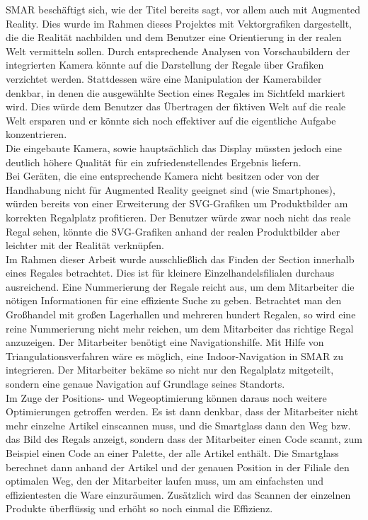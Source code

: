 \ac{SMAR} beschäftigt sich, wie der Titel bereits sagt, vor allem auch mit Augmented Reality. Dies wurde im Rahmen dieses Projektes mit Vektorgrafiken dargestellt, die die Realität nachbilden und dem Benutzer eine Orientierung in der realen Welt vermitteln sollen. Durch entsprechende Analysen von Vorschaubildern der integrierten Kamera könnte auf die Darstellung der Regale über Grafiken verzichtet werden. Stattdessen wäre eine Manipulation der Kamerabilder denkbar, in denen die ausgewählte Section eines Regales im Sichtfeld markiert wird. Dies würde dem Benutzer das Übertragen der fiktiven Welt auf die reale Welt ersparen und er könnte sich noch effektiver auf die eigentliche Aufgabe konzentrieren.\\
Die eingebaute Kamera, sowie hauptsächlich das Display müssten jedoch eine deutlich höhere Qualität für ein zufriedenstellendes Ergebnis liefern.\\
Bei Geräten, die eine entsprechende Kamera nicht besitzen oder von der Handhabung nicht für Augmented Reality geeignet sind (wie \zB Smartphones), würden bereits von einer Erweiterung der SVG-Grafiken um Produktbilder am korrekten Regalplatz profitieren. Der Benutzer würde zwar noch nicht das reale Regal sehen, könnte die SVG-Grafiken anhand der realen Produktbilder aber leichter mit der Realität verknüpfen.\\

Im Rahmen dieser Arbeit wurde ausschließlich das Finden der Section innerhalb eines Regales betrachtet. Dies ist für kleinere Einzelhandelsfilialen durchaus ausreichend. Eine Nummerierung der Regale reicht aus, um dem Mitarbeiter die nötigen Informationen für eine effiziente Suche zu geben. Betrachtet man den Großhandel mit großen Lagerhallen und mehreren hundert Regalen, so wird eine reine Nummerierung nicht mehr reichen, um dem Mitarbeiter das richtige Regal anzuzeigen. Der Mitarbeiter benötigt eine Navigationshilfe. Mit Hilfe von Triangulationsverfahren wäre es möglich, eine Indoor-Navigation in \ac{SMAR} zu integrieren. Der Mitarbeiter bekäme so nicht nur den Regalplatz mitgeteilt, sondern eine genaue Navigation auf Grundlage seines Standorts.\\
Im Zuge der Positions- und Wegeoptimierung können daraus noch weitere Optimierungen getroffen werden. Es ist dann denkbar, dass der Mitarbeiter nicht mehr einzelne Artikel einscannen muss, und die Smartglass dann den Weg bzw. das Bild des Regals anzeigt, sondern dass der Mitarbeiter einen Code scannt, zum Beispiel einen Code an einer Palette, der alle Artikel enthält. Die Smartglass berechnet dann anhand der Artikel und der genauen Position in der Filiale den optimalen Weg, den der Mitarbeiter laufen muss, um am einfachsten und effizientesten die Ware einzuräumen. Zusätzlich wird das Scannen der einzelnen Produkte überflüssig und erhöht so noch einmal die Effizienz.\\

